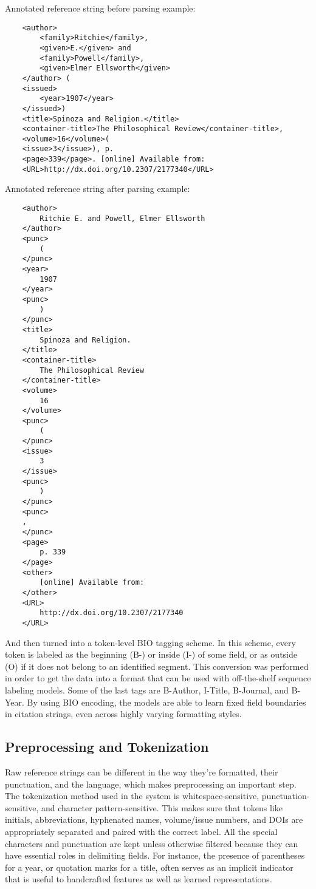 Annotated reference string before parsing example: 
\begin{verbatim}
    <author>
        <family>Ritchie</family>,
        <given>E.</given> and
        <family>Powell</family>,
        <given>Elmer Ellsworth</given>
    </author> (
    <issued>
        <year>1907</year>
    </issued>)
    <title>Spinoza and Religion.</title>
    <container-title>The Philosophical Review</container-title>,
    <volume>16</volume>(
    <issue>3</issue>), p.
    <page>339</page>. [online] Available from:
    <URL>http://dx.doi.org/10.2307/2177340</URL>
\end{verbatim}
Annotated reference string after parsing example:
\begin{verbatim}
    <author>
        Ritchie E. and Powell, Elmer Ellsworth
    </author>
    <punc>
        (
    </punc>
    <year>
        1907
    </year>
    <punc>
        )
    </punc>
    <title>
        Spinoza and Religion.
    </title>
    <container-title>
        The Philosophical Review
    </container-title>
    <volume>
        16
    </volume>
    <punc>
        (
    </punc>
    <issue>
        3
    </issue>
    <punc>
        )
    </punc>
    <punc>
    ,
    </punc> 
    <page>
        p. 339
    </page>
    <other>
        [online] Available from:
    </other>
    <URL>
        http://dx.doi.org/10.2307/2177340
    </URL>
\end{verbatim}
And then turned into a token-level BIO tagging scheme. In this scheme, every token is labeled as the beginning (B-) or inside (I-) of some field, or as outside (O) if it does not belong to an identified segment. This conversion was performed in order to get the data into a format that can be used with off-the-shelf sequence labeling models. Some of the last tags are B-Author, I-Title, B-Journal, and B-Year. By using BIO encoding, the models are able to learn fixed field boundaries in citation strings, even across highly varying formatting styles.

\subsection{Preprocessing and Tokenization}
Raw reference strings can be different in the way they’re formatted, their punctuation, and the language, which makes preprocessing an important step. The tokenization method used in the system is whitespace-sensitive, punctuation-sensitive, and character pattern-sensitive. This makes sure that tokens like initials, abbreviations, hyphenated names, volume/issue numbers, and DOIs are appropriately separated and paired with the correct label.
All the special characters and punctuation are kept unless otherwise filtered because they can have essential roles in delimiting fields. For instance, the presence of parentheses for a year, or quotation marks for a title, often serves as an implicit indicator that is useful to handcrafted features as well as learned representations.

